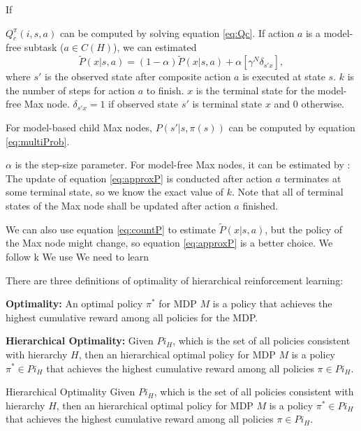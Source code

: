 If 

$Q_c^{\pi}(i, s, a)$ can be computed by solving equation \ref{eq:Qc}.
If action $a$ is a model-free subtask ($a \in C(H)$), 
we can estimated 
\begin{equation}
    \tilde{P}(x|s, a) = (1-\alpha)\tilde{P}(x|s, a) + \alpha [ \gamma^N \delta_{s'x}],
    \label{eq:approxP}
\end{equation}
where $s'$ is the observed state after composite action $a$ is executed at state $s$.
$k$ is the number of steps for action $a$ to finish. 
$x$ is the terminal state for the model-free Max node. $\delta_{s'x}=1$ if observed state $s'$
is terminal state $x$ and 0 otherwise.

For model-based child Max nodes, $P(s'|s, \pi(s))$ can be computed by equation \ref{eq:multiProb}.

$\alpha$ is the step-size parameter.
For model-free Max nodes, it can be estimated by \cite{option}:
The update of equation \ref{eq:approxP} is conducted after action $a$ terminates at some terminal state,
so we know the exact value of $k$. Note that all of terminal states of the Max node shall be updated after 
action $a$ finished.

We can also use equation \ref{eq:countP} to estimate $\tilde{P}(x|s, a)$, but the policy of the Max node
might change, so equation \ref{eq:approxP} is a better choice.
We follow k
We use  We need to learn 

There are three definitions of optimality of hierarchical reinforcement learning:

\begin{definition}
    \textbf{Optimality:} An optimal policy $\pi^*$ for MDP $M$ is a policy that achieves the highest cumulative reward
    among all policies for the MDP.
\end{definition}
\begin{definition}
    \textbf{Hierarchical Optimality:} Given $Pi_H$, which is the set of all policies consistent with hierarchy $H$, 
    then an hierarchical optimal policy for MDP $M$ is a policy $\pi^* \in Pi_H$ that achieves the highest cumulative reward
    among all policies $\pi \in Pi_H$.
\end{definition}
\begin{definition}
    Hierarchical Optimality Given $Pi_H$, which is the set of all policies consistent with hierarchy $H$, 
    then an hierarchical optimal policy for MDP $M$ is a policy $\pi^* \in Pi_H$ that achieves the highest cumulative reward
    among all policies $\pi \in Pi_H$.
\end{definition}

